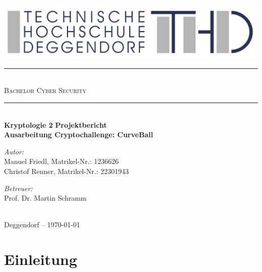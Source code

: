 \documentclass{article}
\begin{document}
\begin{titlepage}
  \begin{center}
    \includegraphics[width=\textwidth]{THD-Logo.pdf}
    \vspace{1cm}
    \rule{1\textwidth}{1mm} \\[0.3cm]
    \textsc{\scshape \huge Bachelor Cyber Security}\\
    \rule{1\textwidth}{1mm} \\[2cm]
    {
      \vspace{1cm}
      \Large \textbf{Kryptologie 2}
      \vspace{3cm}
      \Large \textbf{Projektbericht}
    }\\[0.5cm]
    \LARGE \textbf{Ausarbeitung Cryptochallenge: CurveBall}\\[2cm]
    \begin{minipage}[t]{0.4\textwidth}
      \begin{flushleft}
        \normalsize \emph{Autor:}\\[0.3cm]
        Manuel Friedl, Matrikel-Nr.: 1236626\\
        Christof Renner, Matrikel-Nr.: 22301943
      \end{flushleft}
    \end{minipage}
    \begin{minipage}[t]{0.5\textwidth}
      \begin{flushright}
        \normalsize \emph{Betreuer:}\\[0.3cm]
        Prof. Dr. Martin Schramm
      \end{flushright}
    \end{minipage}\\[3cm]
    {\large Deggendorf – \today\\}
  \end{center}
\end{titlepage}

\newpage
{}
\thispagestyle{empty}

\newpage
\tableofcontents
\thispagestyle{empty}
\newpage

\setcounter{page}{1}

\section{Einleitung}
\end{document}
